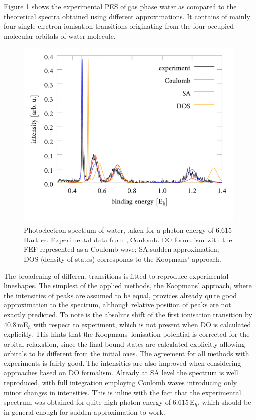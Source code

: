 Figure \ref{fig:waterPES} shows the experimental PES of gas phase water \cite{GrellKuehn} as compared to the theoretical spectra obtained using different approximations. 
It contains of mainly four single-electron ionisation transitions originating from the four occupied molecular orbitals of water molecule.
\begin{figure}
   \includegraphics[width=\textwidth]{Figures/H2O_pes}
   \caption{Photoelectron spectrum of water, taken for a photon energy of $6.615\,$Hartree.
   Experimental data from \cite{GrellKuehn}; Coulomb: DO formalism with the FEF represented as a Coulomb wave;
   SA:sudden approximation; DOS (density of states) corresponds to the Koopmans' approach.}
   \label{fig:waterPES}
\end{figure}
The broadening of different transitions is fitted to reproduce experimental lineshapes.
The simplest of the applied methods, the Koopmans' approach, where the intensities of peaks are assumed to be equal, provides already quite good approximation to the spectrum, although relative position of peaks are not exactly predicted.
To note is the absolute shift of the first ionisation transition by $40.8\,$mE$_h$ with respect to experiment, which is not present when DO is calculated explicitly.
This hints that the Koopmans' ionisation potential is corrected for the orbital relaxation, since the final bound states are calculated explicitly allowing orbitals to be different from the initial ones.
The agreement for all methods with experiments is fairly good.
The intensities are also improved when considering approaches based on DO formalism.
Already at SA level the spectrum is well reproduced, with full integration employing Coulomb waves introducing only minor changes in intensities.
This is inline with the fact that the experimental spectrum was obtained for quite high photon energy of $6.615\,$E$_h$, which should be in general enough for sudden approximation to work. 

